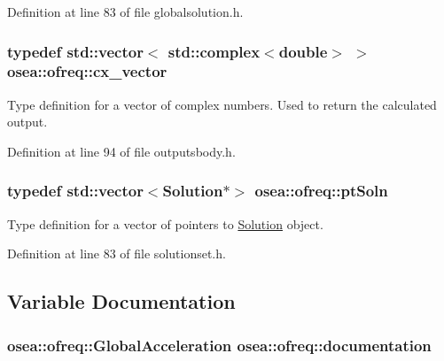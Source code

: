 Definition at line 83 of file globalsolution.\-h.

\hypertarget{namespaceosea_1_1ofreq_a42bf1d8bbba99693142c4184486ad3e0}{
\subsubsection[{cx\-\_\-vector}]{\setlength{\rightskip}{0pt plus 5cm}typedef std\-::vector$<$ std\-::complex$<$double$>$ $>$ {\bf osea\-::ofreq\-::cx\-\_\-vector}}}\label{namespaceosea_1_1ofreq_a42bf1d8bbba99693142c4184486ad3e0}


Type definition for a vector of complex numbers. Used to return the calculated output. 



Definition at line 94 of file outputsbody.\-h.

\hypertarget{namespaceosea_1_1ofreq_a951464fca478bccfc9e5295910e5eec3}{
\subsubsection[{pt\-Soln}]{\setlength{\rightskip}{0pt plus 5cm}typedef std\-::vector$<${\bf Solution}$\ast$$>$ {\bf osea\-::ofreq\-::pt\-Soln}}}\label{namespaceosea_1_1ofreq_a951464fca478bccfc9e5295910e5eec3}
Type definition for a vector of pointers to \hyperlink{classosea_1_1ofreq_1_1_solution}{Solution} object. 

Definition at line 83 of file solutionset.\-h.



\subsection{Variable Documentation}
\hypertarget{namespaceosea_1_1ofreq_a0abf1323420ab8be986df47ea56c3948}{
\subsubsection[{documentation}]{\setlength{\rightskip}{0pt plus 5cm} {\bf osea\-::ofreq\-::\-Global\-Acceleration} osea\-::ofreq\-::documentation}}\label{namespaceosea_1_1ofreq_a0abf1323420ab8be986df47ea56c3948}
